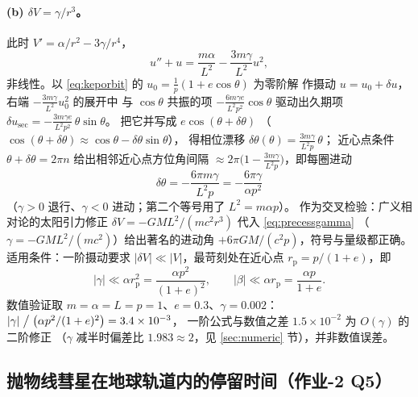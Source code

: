 \documentclass[UTF8,a4paper,11pt]{ctexart}
\begin{document}
\paragraph{(b) $\delta V=\gamma/r^3$。}
此时 $V'=\alpha/r^2-3\gamma/r^4$，
\begin{equation}
  u''+u=\frac{m\alpha}{L^2}-\frac{3m\gamma}{L^2}u^2,
  \label{eq:binetgamma}
\end{equation}
非线性。以 \eqref{eq:keporbit} 的 $u_0=\frac1p(1+e\cos\theta)$ 为零阶解
作摄动 $u=u_0+\delta u$，右端 $-\frac{3m\gamma}{L^2}u_0^2$ 的展开中
与 $\cos\theta$ 共振的项 $-\frac{6m\gamma e}{L^2p^2}\cos\theta$
驱动出久期项 $\delta u_{\mathrm{sec}}
=-\frac{3m\gamma e}{L^2p^2}\,\theta\sin\theta$。
把它并写成 $e\cos(\theta+\delta\theta)$
（$\cos(\theta+\delta\theta)\approx\cos\theta-\delta\theta\sin\theta$），
得相位漂移 $\delta\theta(\theta)=\frac{3m\gamma}{L^2p}\,\theta$；
近心点条件 $\theta+\delta\theta=2\pi n$ 给出相邻近心点方位角间隔
$\approx2\pi\bigl(1-\frac{3m\gamma}{L^2p}\bigr)$，即每圈进动
\begin{equation}
  \boxed{\;\delta\theta=-\frac{6\pi m\gamma}{L^2p}
  =-\frac{6\pi\gamma}{\alpha p^2}\;}
  \label{eq:precessgamma}
\end{equation}
（$\gamma>0$ 退行、$\gamma<0$ 进动；第二个等号用了 $L^2=m\alpha p$）。
作为交叉检验：广义相对论的太阳引力修正
$\delta V=-GML^2/(mc^2r^3)$ 代入 \eqref{eq:precessgamma}
（$\gamma=-GML^2/(mc^2)$）给出著名的进动角
$+6\pi GM/(c^2p)$，符号与量级都正确。
适用条件：一阶摄动要求 $|\delta V|\ll|V|$，最苛刻处在近心点
$r_{\mathrm p}=p/(1+e)$，即
\begin{equation}
  |\gamma|\ll\alpha r_{\mathrm p}^2=\frac{\alpha p^2}{(1+e)^2},
  \qquad
  |\beta|\ll\alpha r_{\mathrm p}=\frac{\alpha p}{1+e}.
  \label{eq:pertvalid}
\end{equation}
数值验证取 $m=\alpha=L=p=1$、$e=0.3$、$\gamma=0.002$：
$|\gamma|\bigm/\bigl(\alpha p^2/(1+e)^2\bigr)=3.4\times10^{-3}$，
一阶公式与数值之差 $1.5\times10^{-2}$ 为 $O(\gamma)$ 的二阶修正
（$\gamma$ 减半时偏差比 $1.983\approx2$，见 \ref{sec:numeric} 节），并非数值误差。

\subsection{抛物线彗星在地球轨道内的停留时间（作业-2 Q5）}
\label{sub:comet}
\end{document}
